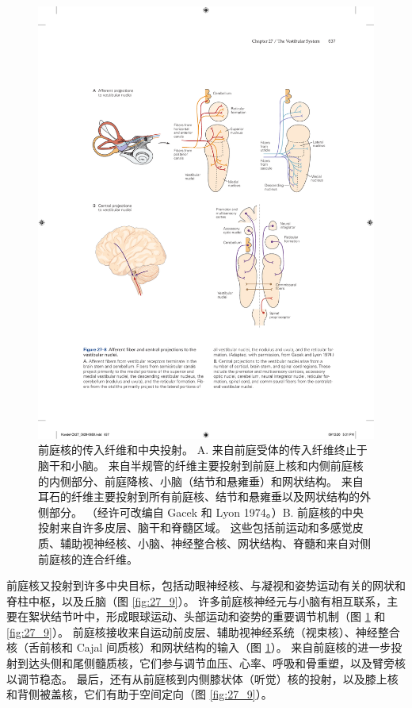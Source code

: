 \begin{figure}[htbp]
	\centering
	\includegraphics[width=0.8\linewidth]{chap27/fig_27_8}
	\caption{前庭核的传入纤维和中央投射。 A. 来自前庭受体的传入纤维终止于脑干和小脑。 来自半规管的纤维主要投射到前庭上核和内侧前庭核的内侧部分、前庭降核、小脑（结节和悬雍垂）和网状结构。 来自耳石的纤维主要投射到所有前庭核、结节和悬雍垂以及网状结构的外侧部分。 （经许可改编自 Gacek 和 Lyon 1974。）B. 前庭核的中央投射来自许多皮层、脑干和脊髓区域。 这些包括前运动和多感觉皮质、辅助视神经核、小脑、神经整合核、网状结构、脊髓和来自对侧前庭核的连合纤维。}
	\label{fig:27_8}
\end{figure}


前庭核又投射到许多中央目标，包括动眼神经核、与凝视和姿势运动有关的网状和脊柱中枢，以及丘脑（图 \ref{fig:27_9}）。 
许多前庭核神经元与小脑有相互联系，主要在絮状结节叶中，形成眼球运动、头部运动和姿势的重要调节机制（图 \ref{fig:27_8} 和 \ref{fig:27_9}）。
前庭核接收来自运动前皮层、辅助视神经系统（视束核）、神经整合核（舌前核和 Cajal 间质核）和网状结构的输入（图 \ref{fig:27_8}）。
来自前庭核的进一步投射到达头侧和尾侧髓质核，它们参与调节血压、心率、呼吸和骨重塑，以及臂旁核以调节稳态。
最后，还有从前庭核到内侧膝状体（听觉）核的投射，以及膝上核和背侧被盖核，它们有助于空间定向（图 \ref{fig:27_9}）。


